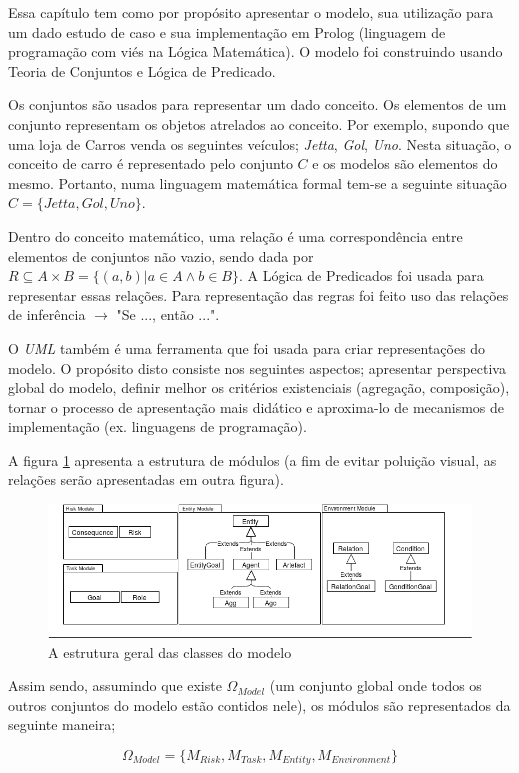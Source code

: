 Essa capítulo tem como por propósito apresentar o modelo, sua utilização para um dado estudo de caso e sua implementação 
em Prolog (linguagem de programação com viés na Lógica Matemática). O modelo foi construindo usando Teoria de Conjuntos
e Lógica de Predicado.

Os conjuntos são usados para representar um dado conceito. Os elementos de um conjunto representam os objetos atrelados ao 
conceito. Por exemplo, supondo que uma loja de Carros venda os seguintes veículos; \textit{Jetta}, \textit{Gol}, \textit{Uno}.
Nesta situação, o conceito de carro é representado pelo conjunto $C$ e os modelos são elementos do mesmo. Portanto, numa linguagem
matemática formal tem-se a seguinte situação $C = \{Jetta,Gol,Uno\}$. 

Dentro do conceito matemático, uma relação é uma correspondência entre elementos de conjuntos não vazio, sendo dada por
$R \subseteq  A \times B = \{(a,b)| a \in A \wedge b \in B \}$. A Lógica de Predicados foi usada para representar essas
relações. Para representação das regras foi feito uso das relações de inferência $\rightarrow$ "Se ..., então ...".  

O \textit{UML} também é uma ferramenta que foi usada para criar representações do modelo. O propósito disto consiste nos
seguintes aspectos; apresentar perspectiva global do modelo, definir melhor os critérios existenciais (agregação, composição),
tornar o processo de apresentação mais didático e aproxima-lo de mecanismos de implementação (ex. linguagens de programação). 

A figura \ref{module} apresenta a estrutura de módulos (a fim de evitar poluição visual, as relações serão apresentadas
em outra figura). 

\begin{figure}[H]
  \centering
  \includegraphics[width=1\linewidth]{figure/Module.png} 
  \caption{A estrutura geral das classes do modelo}
  \label{module}
\end{figure}

Assim sendo, assumindo que existe $\Omega_{Model}$ (um conjunto global onde todos os outros conjuntos do modelo estão 
contidos nele), os módulos são representados da seguinte maneira; 

\begin{equation} 
    \Omega_{Model} = \{ M_{Risk}, M_{Task}, M_{Entity}, M_{Environment}\}
\end{equation}
\label{modules}